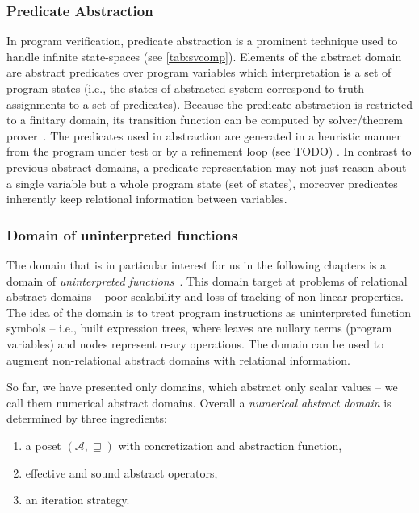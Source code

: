\subsubsection{Predicate Abstraction}

In program verification, predicate abstraction \cite{Graf1997, Bjorner1997} is
a prominent technique used to handle infinite state-spaces (see
\autoref{tab:svcomp}). Elements of the abstract domain are abstract predicates
over program variables which interpretation is a set of program states (i.e.,
the states of abstracted system correspond to truth assignments to a set of
predicates). Because the predicate abstraction is restricted to a finitary
domain, its transition function can be computed by \smt solver/theorem
prover~\cite{Cousot2003, Ball2001}. The predicates used in abstraction are
generated in a heuristic manner from the program under test or by a refinement
loop (see TODO) \cite{Flanagan2002}. In contrast to previous abstract domains,
a predicate representation may not just reason about a single variable but a
whole program state (set of states), moreover predicates inherently keep
relational information between variables.


\subsubsection{Domain of uninterpreted functions}

The domain that is in particular interest for us in the following chapters is a
domain of \emph{uninterpreted functions}~\cite{Gange2016}. This domain target
at problems of relational abstract domains -- poor scalability and loss of
tracking of non-linear properties. The idea of the domain is to treat program
instructions as uninterpreted function symbols -- i.e., built expression trees,
where leaves are nullary terms (program variables) and nodes represent n-ary
operations. The domain can be used to augment non-relational abstract domains
with relational information.


\bigskip
\prule
\bigskip

\noindent
So far, we have presented only domains, which abstract only scalar values -- we call
them numerical abstract domains.  Overall a \emph{numerical abstract domain} is
determined by three ingredients:

\label{sec:ingredients}
\begin{enumerate}
    \item a poset $(\mathcal{A}, \sqsupseteq)$ with concretization and abstraction function,
    \item effective and sound abstract operators,
    \item an iteration strategy.
\end{enumerate}

